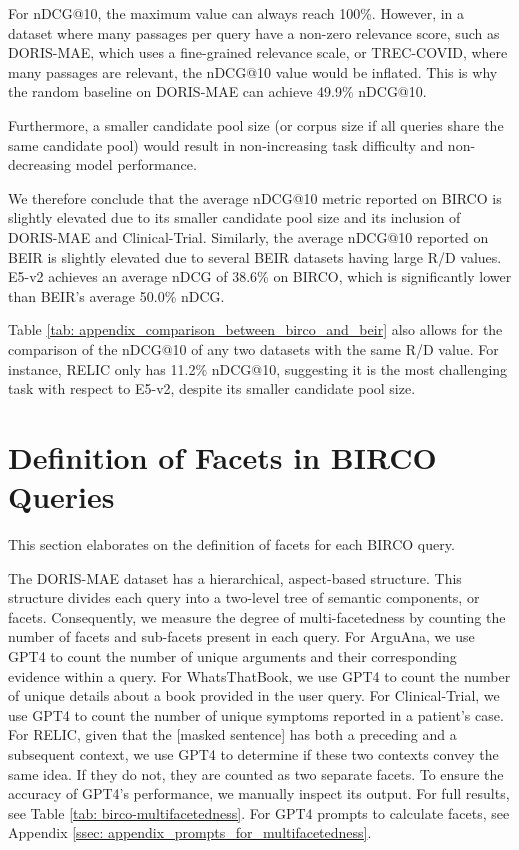\documentclass[11pt]{article}
\begin{document}
For nDCG@10, the maximum value can always reach 100\%. However, in a dataset where many passages per query have a non-zero relevance score, such as DORIS-MAE, which uses a fine-grained relevance scale, or TREC-COVID, where many passages are relevant, the nDCG@10 value would be inflated. This is why the random baseline on DORIS-MAE can achieve 49.9\% nDCG@10.

Furthermore, a smaller candidate pool size (or corpus size if all queries share the same candidate pool) would result in non-increasing task difficulty and non-decreasing model performance.

We therefore conclude that the average nDCG@10 metric reported on BIRCO is slightly elevated due to its smaller candidate pool size and its inclusion of DORIS-MAE and Clinical-Trial. Similarly, the average nDCG@10 reported on BEIR is slightly elevated due to several BEIR datasets having large R/D values. %
E5-v2 achieves an average nDCG of 38.6\% on BIRCO, which is significantly lower than BEIR's average 50.0\% nDCG.

Table \ref{tab: appendix_comparison_between_birco_and_beir} also allows for the comparison of the nDCG@10 of any two datasets with the same R/D value. For instance, RELIC only has 11.2\% nDCG@10, suggesting it is the most challenging task with respect to E5-v2, despite its smaller candidate pool size.

\section{Definition of Facets in BIRCO Queries}
\label{sec: appendix_procedure to calculate facets from queries}
This section elaborates on the definition of facets for each BIRCO query.

The DORIS-MAE dataset has a hierarchical, aspect-based structure. This structure divides each query into a two-level tree of semantic components, or facets. Consequently, we measure the degree of multi-facetedness by counting the number of facets and sub-facets present in each query. For ArguAna, we use GPT4 to count the number of unique arguments and their corresponding evidence within a query. For WhatsThatBook, we use GPT4 to count the number of unique details about a book provided in the user query. For Clinical-Trial, we use GPT4 to count the number of unique symptoms reported in a patient's case. For RELIC, given that the [masked sentence] has both a preceding and a subsequent context, we use GPT4 to determine if these two contexts convey the same idea. If they do not, they are counted as two separate facets. To ensure the accuracy of GPT4's performance, we manually inspect its output. For full results, see Table \ref{tab: birco-multifacetedness}. For GPT4 prompts to calculate facets, see Appendix \ref{ssec: appendix_prompts_for_multifacetedness}. 
\end{document}
